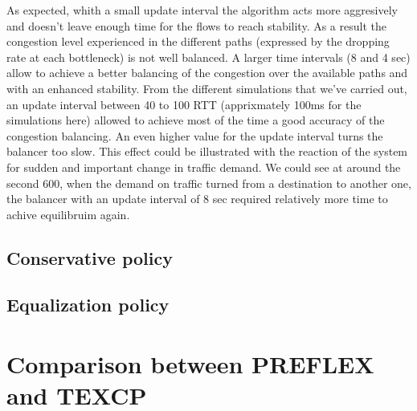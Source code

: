 As expected, whith a small update interval the algorithm acts more aggresively and doesn't leave enough time for the flows to reach stability. As a result the congestion level experienced in the different paths (expressed by the dropping rate at each bottleneck) is not well balanced. A larger time intervals (8 and 4 sec) allow to achieve a better balancing of the congestion over the available paths and with an enhanced stability. From the different simulations that we've carried out, an update interval between 40 to 100 RTT (apprixmately 100ms for the simulations here) allowed to achieve most of the time a good accuracy of the congestion balancing. An even higher value for the update interval turns the balancer too slow. This effect could be illustrated with the reaction of the system for sudden and important change in traffic demand. We could see at around the second 600, when the demand on traffic turned from a destination to another one, the balancer with an update interval of 8 sec required relatively more time to achive equilibruim again.    
 
 


\subsection{Conservative policy}



\subsection{Equalization policy}

\section{Comparison between PREFLEX and TEXCP}